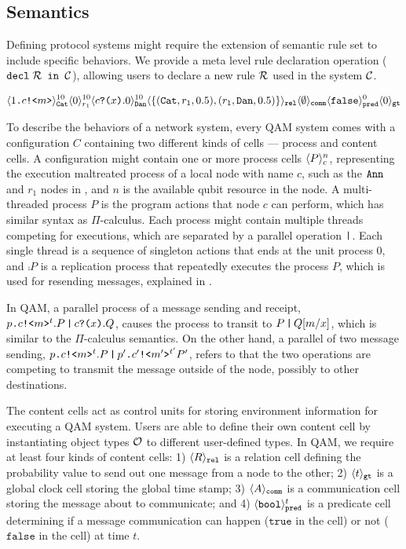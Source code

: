 \subsection{Semantics} \label{sec:qamsemantics}

Defining protocol systems might require the extension of semantic rule set to include specific behaviors.
We provide a meta level rule declaration operation ($\texttt{decl}\;\mathcal{R}\texttt{ in }\mathcal{C}$), allowing users to declare a new rule $\mathcal{R}$ used in the system $\mathcal{C}$. 

{\footnotesize
\[
\langle 1\texttt{.}c\texttt{!<}m\texttt{>} \rangle^{10}_{\texttt{Cat}}\langle 0 \rangle^{10}_{r_1}
\langle c\texttt{?(}x\texttt{)}.0 \rangle^{10}_{\texttt{Dan}} 
\langle \{(\texttt{Cat},r_1,0.5), (r_1,\texttt{Dan},0.5)\} \rangle_{\texttt{rel}}
\langle \emptyset \rangle_{\texttt{comm}}
\langle \texttt{false} \rangle^{0}_{\texttt{pred}}
\langle 0 \rangle_{\texttt{gt}}
\]
}

To describe the behaviors of a network system, every QAM system comes with a configuration $C$
containing two different kinds of cells --- process and content cells.
A configuration might contain one or more process cells $\langle P \rangle^{n}_{c}$, representing the execution maltreated process of a local node with name $c$, such as the $\texttt{Ann}$ and $r_1$ nodes in ,
and $n$ is the available qubit resource in the node.
A multi-threaded process $P$ is the program actions that node $c$ can perform, which has similar syntax as $\Pi$-calculus.
Each process might contain multiple threads competing for executions, which are separated by a parallel operation $\texttt{|}$.
Each single thread is a sequence of singleton actions that ends at the unit process $0$,
and $\comp{P}$ is a replication process that repeatedly executes the process $P$, 
which is used for resending messages, explained in .

In QAM, a parallel process of a message sending and receipt, $p\texttt{.}c\texttt{!<}m\texttt{>}^t.P\,\texttt{|}\,c\texttt{?(}x\texttt{)}.Q$,
causes the process to transit to $P\,\texttt{|}\,Q[m/x]$, which is similar to the $\Pi$-calculus semantics.
On the other hand, a parallel of two message sending, $p\texttt{.}c\texttt{!<}m\texttt{>}^t.P\,\texttt{|}\,p'\texttt{.}c'\texttt{!<}m'\texttt{>}^{t'}{P'}$,
refers to that the two operations are competing to transmit the message outside of the node, possibly to other destinations.

The content cells act as control units for storing environment information for executing a QAM system.
Users are able to define their own content cell by instantiating object types $\mathcal{O}$ to different user-defined types.
In QAM, we require at least four kinds of content cells: 
1) $\langle R \rangle_{\texttt{rel}}$ is a relation cell defining the probability value to send out one message from a node to the other;
2) $\langle t \rangle_{\texttt{gt}}$ is a global clock cell storing the global time stamp;
3) $\langle A \rangle_{\texttt{comm}}$ is a communication cell storing the message about to communicate;
and 4) $\langle \texttt{bool} \rangle^{t}_{\texttt{pred}}$ is a predicate cell 
determining if a message communication can happen ($\texttt{true}$ in the cell) or not ($\texttt{false}$ in the cell) at time $t$.

